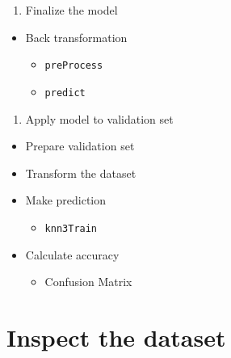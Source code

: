 \documentclass[]{book}
\providecommand{\tightlist}{%
  \setlength{\itemsep}{0pt}\setlength{\parskip}{0pt}}
\begin{document}
\begin{enumerate}
\def\labelenumi{\arabic{enumi}.}
\setcounter{enumi}{10}
\tightlist
\item
  Finalize the model
\end{enumerate}

\begin{itemize}
\tightlist
\item
  Back transformation

  \begin{itemize}
  \tightlist
  \item
    \texttt{preProcess}
  \item
    \texttt{predict}
  \end{itemize}
\end{itemize}

\begin{enumerate}
\def\labelenumi{\arabic{enumi}.}
\setcounter{enumi}{11}
\tightlist
\item
  Apply model to validation set
\end{enumerate}

\begin{itemize}
\tightlist
\item
  Prepare validation set
\item
  Transform the dataset
\item
  Make prediction

  \begin{itemize}
  \tightlist
  \item
    \texttt{knn3Train}
  \end{itemize}
\item
  Calculate accuracy

  \begin{itemize}
  \tightlist
  \item
    Confusion Matrix
  \end{itemize}
\end{itemize}

\hypertarget{inspect-the-dataset}{%
\section{Inspect the dataset}\label{inspect-the-dataset}}
\end{document}
